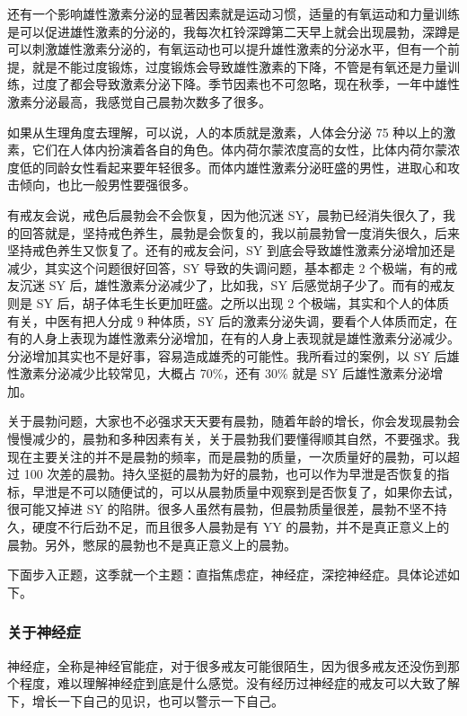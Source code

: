 \documentclass[fontset=founder]{ctexart}
\begin{document}
还有一个影响雄性激素分泌的显著因素就是运动习惯，适量的有氧运动和力量训练是可以促进雄性激素的分泌的，我每次杠铃深蹲第二天早上就会出现晨勃，深蹲是可以刺激雄性激素分泌的，有氧运动也可以提升雄性激素的分泌水平，但有一个前提，就是不能过度锻炼，过度锻炼会导致雄性激素的下降，不管是有氧还是力量训练，过度了都会导致激素分泌下降。季节因素也不可忽略，现在秋季，一年中雄性激素分泌最高，我感觉自己晨勃次数多了很多。

如果从生理角度去理解，可以说，人的本质就是激素，人体会分泌 75 种以上的激素，它们在人体内扮演着各自的角色。体内荷尔蒙浓度高的女性，比体内荷尔蒙浓度低的同龄女性看起来要年轻很多。而体内雄性激素分泌旺盛的男性，进取心和攻击倾向，也比一般男性要强很多。

有戒友会说，戒色后晨勃会不会恢复，因为他沉迷 SY，晨勃已经消失很久了，我的回答就是，坚持戒色养生，晨勃是会恢复的，我以前晨勃曾一度消失很久，后来坚持戒色养生又恢复了。还有的戒友会问，SY 到底会导致雄性激素分泌增加还是减少，其实这个问题很好回答，SY 导致的失调问题，基本都走 2 个极端，有的戒友沉迷 SY 后，雄性激素分泌减少了，比如我，SY 后感觉胡子少了。而有的戒友则是 SY 后，胡子体毛生长更加旺盛。之所以出现 2 个极端，其实和个人的体质有关，中医有把人分成 9 种体质，SY 后的激素分泌失调，要看个人体质而定，在有的人身上表现为雄性激素分泌增加，在有的人身上表现就是雄性激素分泌减少。分泌增加其实也不是好事，容易造成雄秃的可能性。我所看过的案例，以 SY 后雄性激素分泌减少比较常见，大概占 70\%，还有 30\% 就是 SY 后雄性激素分泌增加。

关于晨勃问题，大家也不必强求天天要有晨勃，随着年龄的增长，你会发现晨勃会慢慢减少的，晨勃和多种因素有关，关于晨勃我们要懂得顺其自然，不要强求。我现在主要关注的并不是晨勃的频率，而是晨勃的质量，一次质量好的晨勃，可以超过 100 次差的晨勃。持久坚挺的晨勃为好的晨勃，也可以作为早泄是否恢复的指标，早泄是不可以随便试的，可以从晨勃质量中观察到是否恢复了，如果你去试，很可能又掉进 SY 的陷阱。很多人虽然有晨勃，但晨勃质量很差，晨勃不坚不持久，硬度不行后劲不足，而且很多人晨勃是有 YY 的晨勃，并不是真正意义上的晨勃。另外，憋尿的晨勃也不是真正意义上的晨勃。

下面步入正题，这季就一个主题：直指焦虑症，神经症，深挖神经症。具体论述如下。

\subsubsection{关于神经症}

神经症，全称是神经官能症，对于很多戒友可能很陌生，因为很多戒友还没伤到那个程度，难以理解神经症到底是什么感觉。没有经历过神经症的戒友可以大致了解下，增长一下自己的见识，也可以警示一下自己。
\end{document}
